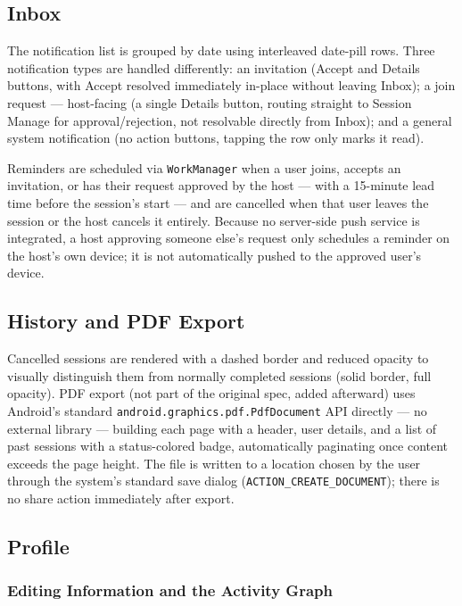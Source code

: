 \subsection{Inbox}

The notification list is grouped by date using interleaved date-pill rows. Three notification types are handled differently: an invitation (Accept and Details buttons, with Accept resolved immediately in-place without leaving Inbox); a join request — host-facing (a single Details button, routing straight to Session Manage for approval/rejection, not resolvable directly from Inbox); and a general system notification (no action buttons, tapping the row only marks it read).

Reminders are scheduled via \texttt{WorkManager} when a user joins, accepts an invitation, or has their request approved by the host — with a 15-minute lead time before the session's start — and are cancelled when that user leaves the session or the host cancels it entirely. Because no server-side push service is integrated, a host approving someone else's request only schedules a reminder on the host's own device; it is not automatically pushed to the approved user's device.

\subsection{History and PDF Export}

Cancelled sessions are rendered with a dashed border and reduced opacity to visually distinguish them from normally completed sessions (solid border, full opacity). PDF export (not part of the original spec, added afterward) uses Android's standard \texttt{android.graphics.pdf.PdfDocument} API directly — no external library — building each page with a header, user details, and a list of past sessions with a status-colored badge, automatically paginating once content exceeds the page height. The file is written to a location chosen by the user through the system's standard save dialog (\texttt{ACTION\_CREATE\_DOCUMENT}); there is no share action immediately after export.

\subsection{Profile}

\subsubsection{Editing Information and the Activity Graph}

